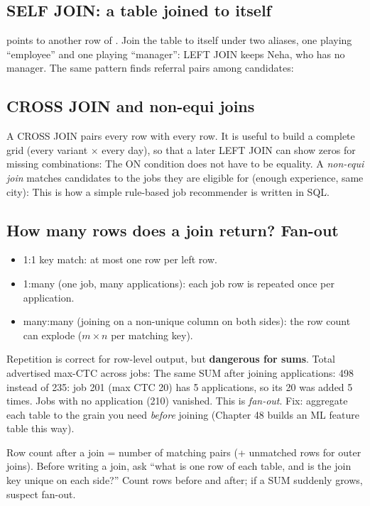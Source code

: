 \subsection{SELF JOIN: a table joined to itself}
 points to another row of . Join the table to itself under two aliases, one playing ``employee'' and one
playing ``manager'':
LEFT JOIN keeps Neha, who has no manager. The same pattern finds referral pairs among candidates:

\subsection{CROSS JOIN and non-equi joins}
A CROSS JOIN pairs every row with every row. It is useful to build a complete grid (every variant $\times$ every day), so that a later LEFT JOIN can show
zeros for missing combinations:
The ON condition does not have to be equality. A \emph{non-equi join} matches candidates to the jobs they are eligible for (enough experience, same city):
This is how a simple rule-based job recommender is written in SQL.

\subsection{How many rows does a join return? Fan-out}
\begin{itemize}
\item 1:1 key match: at most one row per left row.
\item 1:many (one job, many applications): each job row is repeated once per application.
\item many:many (joining on a non-unique column on both sides): the row count can explode ($m \times n$ per matching key).
\end{itemize}
Repetition is correct for row-level output, but \textbf{dangerous for sums}. Total advertised max-CTC across jobs:
The same SUM after joining applications:
498 instead of 235: job 201 (max CTC 20) has 5 applications, so its 20 was added 5 times. Jobs with no application (210) vanished. This is \emph{fan-out}.
Fix: aggregate each table to the grain you need \emph{before} joining (Chapter 48 builds an ML feature table this way).

\begin{recap}[: joins]
Row count after a join = number of matching pairs (+ unmatched rows for outer joins). Before writing a join, ask ``what is one row of each table, and is
the join key unique on each side?'' Count rows before and after; if a SUM suddenly grows, suspect fan-out.
\end{recap}

